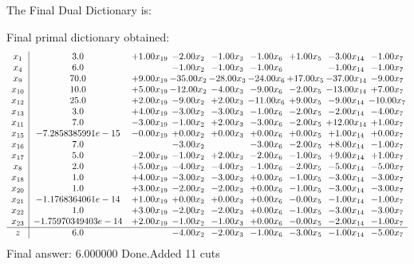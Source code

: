 \documentclass[8pt]{article}
\begin{document}
The Final Dual Dictionary is: 

 Final primal dictionary obtained: 
\[\begin{array}{c| c c@{\hskip 2pt} c@{\hskip 2pt} c@{\hskip 2pt} c@{\hskip 2pt} c@{\hskip 2pt} c@{\hskip 2pt} c@{\hskip 2pt} }
 x_{1}   &  3.0 & +  1.00 x_{19} & -2.00 x_{2} & -1.00 x_{3} & -1.00 x_{6} & +  1.00 x_{5} & -3.00 x_{14} & -1.00 x_{7}\\
 x_{4}   &  6.0  &   & -1.00 x_{2} & -1.00 x_{3} & -1.00 x_{6} &   & -1.00 x_{14} & -1.00 x_{7}\\
 x_{9}   &  70.0 & +  9.00 x_{19} & -35.00 x_{2} & -28.00 x_{3} & -24.00 x_{6} & + 17.00 x_{5} & -37.00 x_{14} & -9.00 x_{7}\\
 x_{10}   &  10.0 & +  5.00 x_{19} & -12.00 x_{2} & -4.00 x_{3} & -9.00 x_{6} & -2.00 x_{5} & -13.00 x_{14} & +  7.00 x_{7}\\
 x_{12}   &  25.0 & +  2.00 x_{19} & -9.00 x_{2} & +  2.00 x_{3} & -11.00 x_{6} & +  9.00 x_{5} & -9.00 x_{14} & -10.00 x_{7}\\
 x_{13}   &  3.0 & +  4.00 x_{19} & -3.00 x_{2} & -3.00 x_{3} & -1.00 x_{6} & -2.00 x_{5} & -2.00 x_{14} & -4.00 x_{7}\\
 x_{11}   &  7.0 & -3.00 x_{19} & -1.00 x_{2} & +  2.00 x_{3} & -3.00 x_{6} & -2.00 x_{5} & + 12.00 x_{14} & +  1.00 x_{7}\\
 x_{15}   &  -7.2858385991e-15 & -0.00 x_{19} & +  0.00 x_{2} & +  0.00 x_{3} & +  0.00 x_{6} & +  0.00 x_{5} & +  1.00 x_{14} & +  0.00 x_{7}\\
 x_{16}   &  7.0  &   & -3.00 x_{2} &   & -3.00 x_{6} & -2.00 x_{5} & +  8.00 x_{14} & -1.00 x_{7}\\
 x_{17}   &  5.0 & -2.00 x_{19} & -1.00 x_{2} & +  2.00 x_{3} & -2.00 x_{6} & -1.00 x_{5} & +  9.00 x_{14} & +  1.00 x_{7}\\
 x_{8}   &  2.0 & +  5.00 x_{19} & -4.00 x_{2} & -4.00 x_{3} & -1.00 x_{6} & -2.00 x_{5} & -5.00 x_{14} & -5.00 x_{7}\\
 x_{18}   &  1.0 & +  4.00 x_{19} & -3.00 x_{2} & -3.00 x_{3} & +  0.00 x_{6} & -1.00 x_{5} & -3.00 x_{14} & -3.00 x_{7}\\
 x_{20}   &  1.0 & +  3.00 x_{19} & -2.00 x_{2} & -2.00 x_{3} & +  0.00 x_{6} & -1.00 x_{5} & -3.00 x_{14} & -3.00 x_{7}\\
 x_{21}   &  -1.1768364061e-14 & +  1.00 x_{19} & +  0.00 x_{2} & +  0.00 x_{3} & +  0.00 x_{6} & -0.00 x_{5} & -1.00 x_{14} & -1.00 x_{7}\\
 x_{22}   &  1.0 & +  3.00 x_{19} & -2.00 x_{2} & -2.00 x_{3} & +  0.00 x_{6} & -1.00 x_{5} & -3.00 x_{14} & -3.00 x_{7}\\
 x_{23}   &  -1.75970349403e-14 & +  2.00 x_{19} & -1.00 x_{2} & -1.00 x_{3} & +  0.00 x_{6} & -0.00 x_{5} & -2.00 x_{14} & -1.00 x_{7}\\
\hline
z    &  6.0  &   & -4.00 x_{2} & -2.00 x_{3} & -1.00 x_{6} & -3.00 x_{5} & -1.00 x_{14} & -5.00 x_{7}\\
\end{array}\]
 Final answer: 6.000000 
Done.Added 11 cuts 
\end{document}

